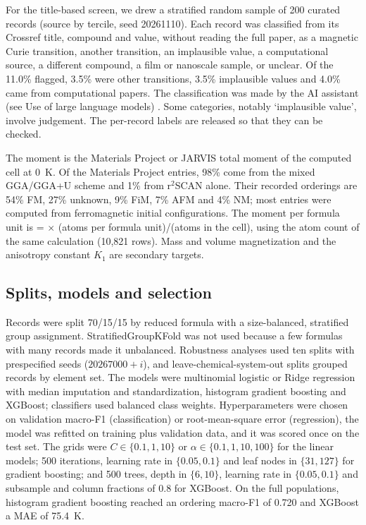\documentclass[11pt,a4paper]{article}
\begin{document}
For the title-based screen, we drew a stratified random sample of 200 curated records (source by \Tc{} tercile, seed 20261110). Each record was classified from its Crossref title, compound and value, without reading the full paper, as a magnetic Curie transition, another transition, an implausible value, a computational source, a different compound, a film or nanoscale sample, or unclear. Of the 11.0\% flagged, 3.5\% were other transitions, 3.5\% implausible values and 4.0\% came from computational papers. The classification was made by the AI assistant (see Use of large language models) . Some categories, notably `implausible value', involve judgement. The per-record labels are released so that they can be checked.

The moment \mcell{} is the Materials Project or JARVIS total moment of the computed cell at 0~K. Of the Materials Project entries, 98\% come from the mixed GGA/GGA+U scheme and 1\% from r$^2$SCAN alone. Their recorded orderings are 54\% FM, 27\% unknown, 9\% FiM, 7\% AFM and 4\% NM; most entries were computed from ferromagnetic initial configurations\cite{horton2019ordering}. The moment per formula unit is \mfu{} = \mcell{} $\times$ (atoms per formula unit)/(atoms in the cell), using the atom count of the same calculation (10,821 rows). Mass and volume magnetization and the anisotropy constant $K_1$ are secondary targets.

\subsection*{Splits, models and selection}
Records were split 70/15/15 by reduced formula with a size-balanced, stratified group assignment. StratifiedGroupKFold was not used because a few formulas with many records made it unbalanced. Robustness analyses used ten splits with prespecified seeds ($20267000+i$), and leave-chemical-system-out splits grouped records by element set. The models were multinomial logistic or Ridge regression with median imputation and standardization, histogram gradient boosting\cite{pedregosa2011sklearn,ke2017lightgbm} and XGBoost\cite{chen2016xgboost}; classifiers used balanced class weights. Hyperparameters were chosen on validation macro-F1 (classification) or root-mean-square error (regression), the model was refitted on training plus validation data, and it was scored once on the test set. The grids were $C\in\{0.1,1,10\}$ or $\alpha\in\{0.1,1,10,100\}$ for the linear models; 500 iterations, learning rate in $\{0.05,0.1\}$ and leaf nodes in $\{31,127\}$ for gradient boosting; and 500 trees, depth in $\{6,10\}$, learning rate in $\{0.05,0.1\}$ and subsample and column fractions of 0.8 for XGBoost. On the full populations, histogram gradient boosting reached an ordering macro-F1 of 0.720 and XGBoost a \Tc{} MAE of 75.4~K.
\end{document}
